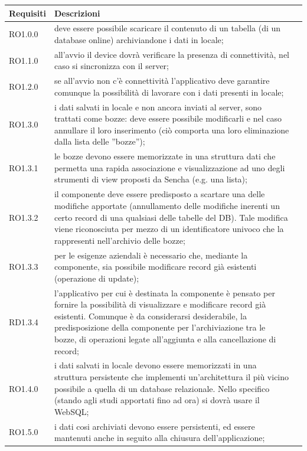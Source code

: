 \documentclass[10pt,a4paper,onecolumn]{article}
\begin{document}
\begin{center}
\begin{longtable}{lp{}l}
\toprule Requisiti & Descrizioni\\
\midrule
RO1.0.0 & deve essere possibile scaricare il contenuto di un tabella (di un database online) archiviandone i dati in locale;\\
RO1.1.0 & all'avvio il device dovrà verificare la presenza di connettività, nel caso si sincronizza con il server;\\
RO1.2.0 & se all'avvio non c'è connettività l'applicativo deve garantire comunque la possibilità di lavorare con i dati presenti in locale;\\
RO1.3.0 & i dati salvati in locale e non ancora inviati al server, sono trattati come bozze: deve essere possibile modificarli e nel caso annullare il loro inserimento (ciò comporta una loro eliminazione dalla lista delle ''bozze'');\\
RO1.3.1 & le bozze devono essere memorizzate in una struttura dati che permetta una rapida associazione e visualizzazione ad uno degli strumenti di view proposti da Sencha (e.g. una lista);\\
RO1.3.2 & il componente deve essere predisposto a scartare una delle modifiche apportate (annullamento delle modifiche inerenti un certo record di una qualsiasi delle tabelle del DB). Tale modifica viene riconosciuta per mezzo di un identificatore univoco che la rappresenti nell'archivio delle bozze;\\
RO1.3.3 & per le esigenze aziendali è necessario che, mediante la componente, sia possibile modificare record già esistenti (operazione di update);\\
RD1.3.4 & l'applicativo per cui è destinata la componente è pensato per fornire la possibilità di visualizzare e modificare record già esistenti. Comunque è da considerarsi desiderabile, la predisposizione della componente per l'archiviazione tra le bozze, di operazioni legate all'aggiunta e alla cancellazione di record;\\
RO1.4.0 & i dati salvati in locale devono essere memorizzati in una struttura persistente che implementi un'architettura il più vicino possibile a quella di un database relazionale. Nello specifico (stando agli studi apportati fino ad ora) si dovrà usare il WebSQL;\\
RO1.5.0 & i dati cosi archiviati devono essere persistenti, ed essere mantenuti anche in seguito alla chiusura dell'applicazione;\\

\end{longtable}
\end{center}
\end{document}
